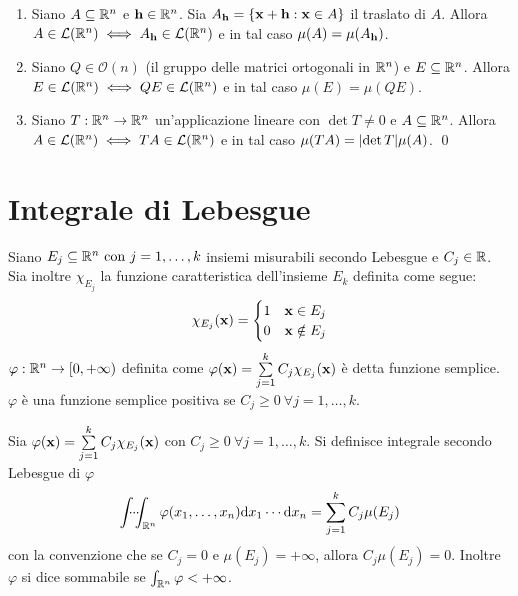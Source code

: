 \begin{theorem}
	\leavevmode
	\begin{enumerate}
		\item Siano $A\subseteq \mathbb{R}^n$ e $\vb{h} \in \mathbb{R}^n$. Sia $A_{\vb{h}}=\{\vb{x}+\vb{h}:\vb{x}\in A\}$ il traslato di $A$. Allora $A \in \mathcal{L}(\mathbb{R}^n)\iff A_{\vb{h}} \in \mathcal{L}(\mathbb{R}^n)$ e in tal caso $\mu(A)=\mu(A_{\vb{h}})$.
		\item Siano $Q\in \mathcal{O}(n)$ (il gruppo delle matrici ortogonali in $\mathbb{R}^n$) e $E\subseteq \mathbb{R}^n$. Allora $E \in \mathcal{L}(\mathbb{R}^n) \iff QE \in \mathcal{L}(\mathbb{R}^n)$ e in tal caso $\mu(E)=\mu(QE)$.
		\item Siano $T: \mathbb{R}^n \to \mathbb{R}^n$ un'applicazione lineare con $\det T \neq 0$ e $A \subseteq \mathbb{R}^n$. Allora $A \in \mathcal{L}(\mathbb{R}^n) \iff TA \in \mathcal{L}(\mathbb{R}^n)$ e in tal caso $\mu(TA) = \abs{\det T}\mu(A)$.
		\qed
	\end{enumerate}
\end{theorem}

\section{Integrale di Lebesgue}

\begin{definition}
	Siano $E_j \subseteq \mathbb{R}^n \text{ con } j=1,\dots,k$ insiemi misurabili secondo Lebesgue e $C_j \in \mathbb{R}$. Sia inoltre $\chi_{E_j}$ la funzione caratteristica dell'insieme $E_k$ definita come segue:
	$$
		\chi_{E_j}(\vb{x}) =
		\begin{cases}
			1 & \vb{x} \in E_j\\
			0 & \vb{x} \notin E_j
		\end{cases}
	$$
	$\varphi: \mathbb{R}^n \to [0, +\infty)$ definita come $\varphi(\vb{x})=\sum\limits_{j=1}^k C_j \chi_{E_j}(\vb{x})$ è detta funzione semplice. $\varphi$ è una funzione semplice positiva se $C_j \geq 0 \ \forall j=1,\dots,k$.
\end{definition}

\begin{definition}
	Sia $\varphi(\vb{x})=\sum\limits_{j=1}^k C_j \chi_{E_j}(\vb{x})$ con $C_j \geq 0 \ \forall j=1,\dots,k$. Si definisce integrale secondo Lebesgue di $\varphi$
	$$
		\idotsint_{\mathbb{R}^n}\varphi(x_1,\dots,x_n)\dd x_1 \cdots \dd x_n = \sum_{j=1}^kC_j\mu(E_j)
	$$
	con la convenzione che se $C_j=0$ e $\mu(E_j)=+\infty$, allora $C_j\mu(E_j)=0$.
	Inoltre $\varphi$ si dice sommabile se $\int_{\mathbb{R}^n} \varphi < + \infty$.
\end{definition}

